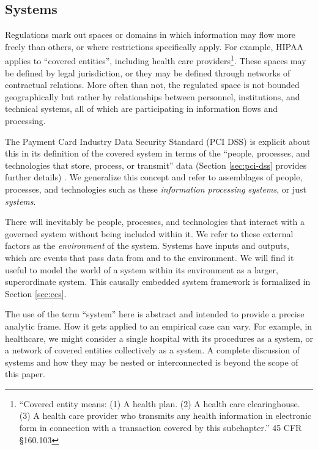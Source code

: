 \documentclass[../thesis.tex]{subfiles}
\begin{document}
\subsection{Systems}

Regulations mark out spaces or domains in which information 
may flow more freely than others, or where restrictions 
specifically apply.
For example, HIPAA applies to ``covered entities'', including 
health care providers\footnote{``Covered entity means: 
(1) A health plan. (2) A health care clearinghouse. 
(3) A health care provider who transmits any health 
information in electronic form in connection with a 
transaction covered by this subchapter.'' 45 CFR \S 160.103}.
These spaces may be defined by legal jurisdiction, or they 
may be defined through networks of contractual relations.
More often than not, the regulated space is not bounded 
geographically but rather by relationships between 
personnel, institutions, and technical systems,
all of which are participating in information flows 
and processing.

The Payment Card Industry Data Security Standard (PCI DSS) 
is explicit about this in its definition of the covered system 
in terms of the
``people, processes, and technologies that store, process, or
transmit'' data (Section \ref{sec:pci-dss} provides further details) \cite{pcisecuritystandardscouncil2016DSS}.
We generalize this concept and
refer to assemblages of people, processes, and technologies 
such as these \emph{information processing systems}, or 
just \emph{systems}.

There will inevitably be people, processes, and technologies
that interact with a governed system without being included
within it. We refer to these external factors as the
\emph{environment} of the system.
Systems have inputs and outputs, which are events
that pass data from and to the environment.
We will find it useful to model the world of a system
within its environment as a larger, superordinate system.
This causally embedded system framework is formalized
in Section \ref{sec:ecs}.

The use of the term ``system'' here is abstract and intended
to provide a precise analytic frame.
How it gets applied to an empirical case can vary.
For example, in healthcare, we might consider a single hospital
with its procedures as a system, or a network of covered entities
collectively as a system.
A complete discussion of systems and how they may be nested or
interconnected is beyond the scope of this paper.
\end{document}
